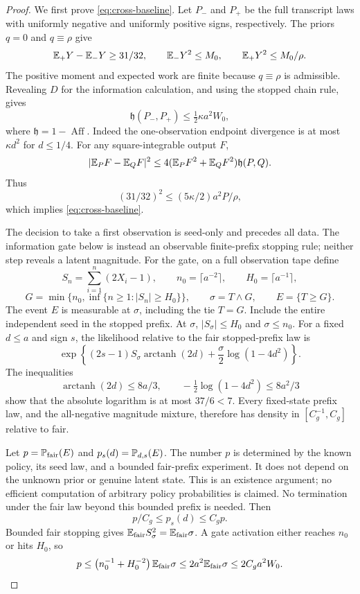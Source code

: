 \begin{proof}
We first prove \eqref{eq:cross-baseline}.  Let \(P_-\) and \(P_+\) be
the full transcript laws with uniformly negative and uniformly positive
signs, respectively.  The priors \(q=0\) and \(q\equiv\rho\) give
\[
 \mathbb E_+Y-\mathbb E_-Y\ge31/32,\qquad
 \mathbb E_-Y^2\le M_0,\qquad \mathbb E_+Y^2\le M_0/\rho.
\]
The positive moment and expected work are finite because \(q\equiv\rho\)
is admissible.  Revealing \(D\) for the information calculation, and
using the stopped chain rule, gives
\[
 \mathfrak h(P_-,P_+)\le\tfrac12\kappa a^2W_0,
\]
where \(\mathfrak h=1-\operatorname{Aff}\).
Indeed the one-observation endpoint divergence is at most
\(\kappa d^2\) for \(d\le1/4\).
For any square-integrable output \(F\),
\begin{equation}
 |\mathbb E_PF-\mathbb E_QF|^2
 \le4(\mathbb E_PF^2+\mathbb E_QF^2)\mathfrak h(P,Q).
 \label{eq:cross-hellinger-moment}
\end{equation}
Thus
\[
 (31/32)^2
 \le(5\kappa/2)a^2P/\rho,
\]
which implies \eqref{eq:cross-baseline}.

The decision to take a first observation is seed-only and precedes
all data. The information gate below is instead an observable
finite-prefix stopping rule; neither step reveals a latent magnitude.
For the gate, on a full observation tape define
\[
 S_n=\sum_{i=1}^n(2X_i-1),\qquad
 n_0=\lceil a^{-2}\rceil,\qquad H_0=\lceil a^{-1}\rceil,
\]
\begin{equation}
 G=\min\{n_0,\inf\{n\ge1:|S_n|\ge H_0\}\},\qquad
 \sigma=T\wedge G,\qquad E=\{T\ge G\}.
 \label{eq:cross-gate}
\end{equation}
The event \(E\) is measurable at \(\sigma\), including the tie \(T=G\).
Include the entire independent seed in the stopped prefix.
At \(\sigma\), \(|S_\sigma|\le H_0\) and \(\sigma\le n_0\).
For a fixed \(d\le a\) and sign \(s\), the likelihood relative to the
fair stopped-prefix law is
\[
 \exp\left\{(2s-1)S_\sigma\operatorname{arctanh}(2d)
       +\frac{\sigma}{2}\log(1-4d^2)\right\}.
\]
The inequalities
\[
 \operatorname{arctanh}(2d)\le8a/3,\qquad
 -\tfrac12\log(1-4d^2)\le8a^2/3
\]
show that the absolute logarithm is at most \(37/6<7\).
Every fixed-state prefix law, and the all-negative magnitude mixture,
therefore has density in \([C_g^{-1},C_g]\) relative to fair.

Let \(p=\mathbb P_{\rm fair}(E)\) and \(p_s(d)=\mathbb P_{d,s}(E)\).
The number $p$ is determined by the known policy, its seed law, and a
bounded fair-prefix experiment. It does not depend on the unknown prior
or genuine latent state. This is an existence argument; no efficient
computation of arbitrary policy probabilities is claimed. No termination
under the fair law beyond this bounded prefix is needed. Then
\begin{equation}
 p/C_g\le p_s(d)\le C_gp.
 \label{eq:cross-gate-probabilities}
\end{equation}
Bounded fair stopping gives
\(\mathbb E_{\rm fair}S_\sigma^2=\mathbb E_{\rm fair}\sigma\).
A gate activation either reaches \(n_0\) or hits \(H_0\), so
\begin{equation}
 p\le\left(n_0^{-1}+H_0^{-2}\right)\mathbb E_{\rm fair}\sigma
 \le2a^2\mathbb E_{\rm fair}\sigma
 \le2C_ga^2W_0.
 \label{eq:cross-gate-cost}
\end{equation}


\end{proof}
